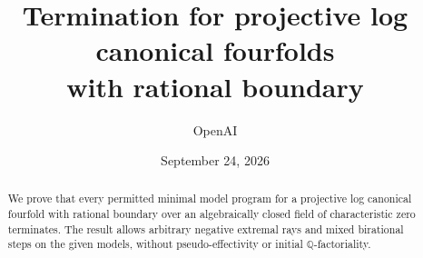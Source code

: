 \documentclass[11pt]{article}
\title{Termination for projective log canonical fourfolds\protect\\ with rational boundary}
\author{OpenAI}
\date{September 24, 2026}
\theoremstyle{definition}
\numberwithin{equation}{section}
\begin{document}
\maketitle
\begin{abstract}
We prove that every permitted minimal model program for a projective log canonical fourfold with rational boundary over an algebraically closed field of characteristic zero terminates. The result allows arbitrary negative extremal rays and mixed birational steps on the given models, without pseudo-effectivity or initial $\mathbb Q$-factoriality.
\end{abstract}
\tableofcontents










\begingroup
\raggedright


\endgroup
\end{document}
